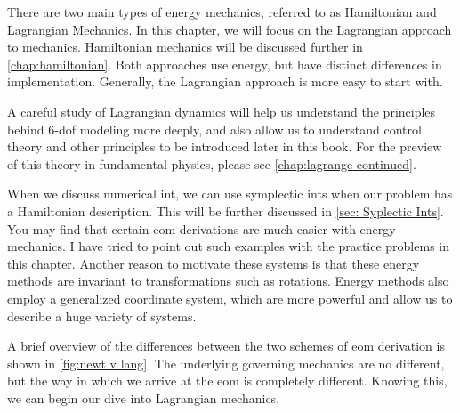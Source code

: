 There are two main types of energy mechanics, referred to as \gls{Hamiltonian} and \gls{Lagrangian} Mechanics. In this chapter, we will focus on the \gls{Lagrangian} approach to mechanics. \gls{Hamiltonian} mechanics will be discussed further in \autoref{chap:hamiltonian}. Both approaches use energy, but have distinct differences in implementation. Generally, the \gls{Lagrangian} approach is more easy to start with.

A careful study of \gls{Lagrangian} dynamics will help us understand the principles behind 6-\gls{dof} modeling more deeply, and also allow us to understand control theory and other principles to be introduced later in this book. For the preview of this theory in fundamental physics, please see \autoref{chap:lagrange continued}.

When we discuss \gls{numerical int}, we can use \glspl{symplectic int} when our problem has a \gls{Hamiltonian} description. This will be further discussed in \autoref{sec: Syplectic Ints}. You may find that certain \gls{eom} derivations are much easier with energy mechanics. I have tried to point out such examples with the practice problems in this chapter. Another reason to motivate these systems is that these energy methods are invariant to transformations such as rotations. Energy methods also employ a generalized coordinate system, which are more powerful and allow us to describe a huge variety of systems.

A brief overview of the differences between the two schemes of \gls{eom} derivation is shown in \autoref{fig:newt v lang}. The underlying governing mechanics are no different, but the way in which we arrive at the \gls{eom} is completely different. Knowing this, we can begin our dive into \gls{Lagrangian} mechanics.

